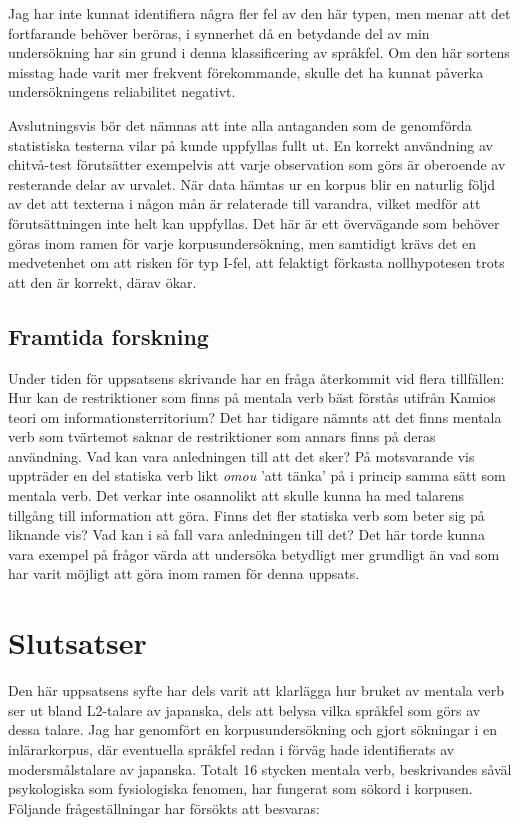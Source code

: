 \documentclass[12pt,a4paper]{article}
\begin{document}
\noindent
Jag har inte kunnat identifiera några fler fel av den här typen, men menar att det fortfarande behöver beröras, i synnerhet då en betydande del av min undersökning har sin grund i denna klassificering av språkfel. Om den här sortens misstag hade varit mer frekvent förekommande, skulle det ha kunnat påverka undersökningens reliabilitet negativt.

Avslutningsvis bör det nämnas att inte alla antaganden som de genomförda statistiska testerna vilar på kunde uppfyllas fullt ut. En korrekt användning av chitvå-test förutsätter exempelvis att varje observation som görs är oberoende av resterande delar av urvalet. När data hämtas ur en korpus blir en naturlig följd av det att texterna i någon mån är relaterade till varandra, vilket medför att förutsättningen inte helt kan uppfyllas. Det här är ett övervägande som behöver göras inom ramen för varje korpusundersökning, men samtidigt krävs det en medvetenhet om att risken för typ I-fel, att felaktigt förkasta nollhypotesen trots att den är korrekt, därav ökar.

\subsection{Framtida forskning}
\label{sec:Diskussion: Framtida forskning}
Under tiden för uppsatsens skrivande har en fråga återkommit vid flera tillfällen: Hur kan de restriktioner som finns på mentala verb bäst förstås utifrån Kamios teori om informationsterritorium? Det har tidigare nämnts att det finns mentala verb som tvärtemot saknar de restriktioner som annars finns på deras användning. Vad kan vara anledningen till att det sker? På motsvarande vis uppträder en del statiska verb likt \emph{omou} 'att tänka' på i princip samma sätt som mentala verb. Det verkar inte osannolikt att skulle kunna ha med talarens tillgång till information att göra. Finns det fler statiska verb som beter sig på liknande vis? Vad kan i så fall vara anledningen till det? Det här torde kunna vara exempel på frågor värda att undersöka betydligt mer grundligt än vad som har varit möjligt att göra inom ramen för denna uppsats.




\newpage
\section{Slutsatser}
\label{ch:Slutsatser}
Den här uppsatsens syfte har dels varit att klarlägga hur bruket av mentala verb ser ut bland L2-talare av japanska, dels att belysa vilka språkfel som görs av dessa talare. Jag har genomfört en korpusundersökning och gjort sökningar i en inlärarkorpus, där eventuella språkfel redan i förväg hade identifierats av modersmålstalare av japanska. Totalt 16 stycken mentala verb, beskrivandes såväl psykologiska som fysiologiska fenomen, har fungerat som sökord i korpusen. Följande frågeställningar har försökts att besvaras:
\end{document}
